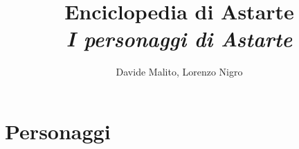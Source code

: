 \documentclass{book}
\author{Davide Malito, Lorenzo Nigro}
\title{Enciclopedia di Astarte \\ \small{\it{I personaggi di Astarte}}}
\begin{document}
\maketitle
\tableofcontents

\chapter{Personaggi}

\end{document}
